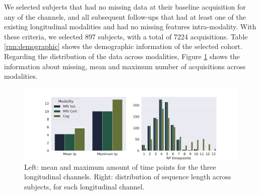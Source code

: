 We selected subjects that had no missing data at their baseline acquisition for any of the channels, and all subsequent follow-ups that had at least one of the existing longitudinal modalities and had no missing features intra-modality. With these criteria, we selected 897 subjects, with a total of 7224 acquisitions. Table \ref{rnn:demographic} shows the demographic information of the selected cohort. Regarding the distribution of the data across modalities, Figure \ref{fig:rnn:missingdata} shows the information about missing, mean and maximum number of acquisitions across modalities. \\

\begin{table}[!htbp]
\centering
{}
\caption[Demographic characteristics of the cohort used, at baseline.]{Demographic characteristics of the cohort at baseline. Age and education presented as average and standard deviation, in years. APOE $\varepsilon$4: Apolipoprotein $\varepsilon$4, percentage with 1 or 2 alleles. CN: Cognitively normal. MCI: Mild cognitive impairment. AD: Alzheimer’s disease. MMSE: Mini-mental state examination. }\label{rnn:demographic}
\end{table}

\begin{figure}[!htbp]
  \centering
  \includegraphics[width=1.0\textwidth]{figures/rnnvae/rnn_long.pdf}
  \caption[Time point distribution of ADNI data.]{Left: mean and maximum amount of time points for the three longitudinal channels. Right: distribution of sequence length across subjects, for each longitudinal channel.}\label{fig:rnn:missingdata}
\end{figure}

